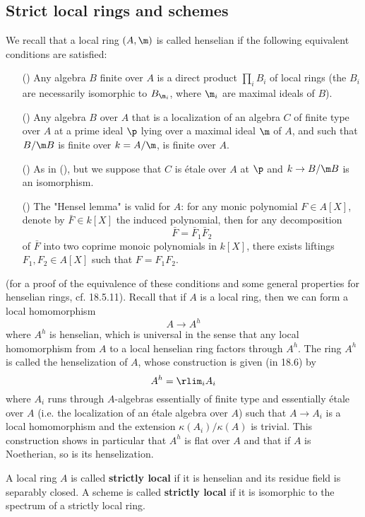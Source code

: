 \subsection{Strict local rings and schemes}
We recall that a local ring $(A,\m)$ is called henselian if the following equivalent conditions are satisfied:
\begin{enumerate}
    \item[(\rmnum{1})] Any algebra $B$ finite over $A$ is a direct product $\prod_iB_i$ of local rings (the $B_i$ are necessarily isomorphic to $B_{\m_i}$, where $\m_i$ are maximal ideals of $B$). 
    \item[(\rmnum{2})] Any algebra $B$ over $A$ that is a localization of an algebra $C$ of finite type over $A$ at a prime ideal $\p$ lying over a maximal ideal $\m$ of $A$, and such that $B/\m B$ is finite over $k=A/\m$, is finite over $A$.
    \item[(\rmnum{3})] As in (), but we suppose that $C$ is \'etale over $A$ at $\p$ and $k\to B/\m B$ is an isomorphism.
    \item[(\rmnum{4})] The "Hensel lemma" is valid for $A$: for any monic polynomial $F\in A[X]$, denote by $\bar{F}\in k[X]$ the induced polynomial, then for any decomposition
    \[\bar{F}=\bar{F}_1\bar{F}_2\]
    of $\bar{F}$ into two coprime monoic polynomials in $k[X]$, there exists liftings $F_1,F_2\in A[X]$ such that $F=F_1F_2$.
\end{enumerate}
(for a proof of the equivalence of these conditions and some general properties for henselian rings, cf. \cite{EGA4-4} 18.5.11). Recall that if $A$ is a local ring, then we can form a local homomorphism
\[A\to A^h\]
where $A^h$ is henselian, which is universal in the sense that any local homomorphism from $A$ to a local henselian ring factors through $A^h$. The ring $A^h$ is called the henselization of $A$, whose construction is given (in \cite{EGA4-4} 18.6) by
\[A^h=\rlim_iA_i\]
where $A_i$ runs through $A$-algebras essentially of finite type and essentially \'etale over $A$ (i.e. the localization of an \'etale algebra over $A$) such that $A\to A_i$ is a local homomorphism and the extension $\kappa(A_i)/\kappa(A)$ is trivial. This construction shows in particular that $A^h$ is flat over $A$ and that if $A$ is Noetherian, so is its henselization.\par
A local ring $A$ is called \textbf{strictly local} if it is henselian and its residue field is separably closed. A scheme is called \textbf{strictly local} if it is isomorphic to the spectrum of a strictly local ring.
